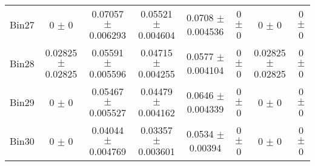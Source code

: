 \begin{tabular}{@{\extracolsep{4pt}}lccccccc@{}}
     Bin27 & 0 $\pm$ 0 & 0.07057 $\pm$ 0.006293 & 0.05521 $\pm$ 0.004604 & 0.0708 $\pm$ 0.004536 & 0 $\pm$ 0 & 0 $\pm$ 0 & 0 $\pm$ 0 \\ 
     Bin28 & 0.02825 $\pm$ 0.02825 & 0.05591 $\pm$ 0.005596 & 0.04715 $\pm$ 0.004255 & 0.0577 $\pm$ 0.004104 & 0 $\pm$ 0 & 0.02825 $\pm$ 0.02825 & 0 $\pm$ 0 \\ 
     Bin29 & 0 $\pm$ 0 & 0.05467 $\pm$ 0.005527 & 0.04479 $\pm$ 0.004162 & 0.0646 $\pm$ 0.004339 & 0 $\pm$ 0 & 0 $\pm$ 0 & 0 $\pm$ 0 \\ 
     Bin30 & 0 $\pm$ 0 & 0.04044 $\pm$ 0.004769 & 0.03357 $\pm$ 0.003601 & 0.0534 $\pm$ 0.00394 & 0 $\pm$ 0 & 0 $\pm$ 0 & 0 $\pm$ 0 \\ 
\hline\hline
  \end{tabular}
